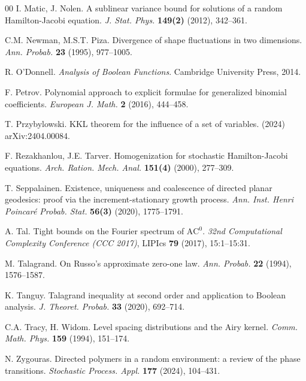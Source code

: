 \documentclass[reqno]{amsart}
\begin{document}
\begin{thebibliography}{00}
 I. Matic, J. Nolen. A sublinear variance bound 
for solutions of a random Hamilton-Jacobi equation. {\em J. Stat. Phys.}
{\bf 149(2)} (2012), 342--361.

 C.M. Newman, M.S.T. Piza. Divergence of shape 
fluctuations in two dimensions. {\em Ann. Probab.} {\bf 23} (1995), 
977--1005.

 R. O'Donnell. {\em Analysis of Boolean Functions}. 
Cambridge University Press, 2014.

 F. Petrov. Polynomial approach to explicit formulae 
for generalized binomial coefficients. {\em European J. Math.} {\bf 2} 
(2016), 444--458.

 T. Przybylowski. KKL theorem for the influence 
of a set of variables. (2024) arXiv:2404.00084.

 F. Rezakhanlou, J.E. Tarver. 
Homogenization for stochastic Hamilton-Jacobi equations. 
{\em Arch. Ration. Mech. Anal.} {\bf 151(4)} (2000), 277--309.

 T. Seppalainen. Existence, uniqueness and 
coalescence of directed planar geodesics: proof via the 
increment-stationary growth process. {\em Ann. Inst. Henri Poincar\'e 
Probab. Stat.} {\bf 56(3)} (2020), 1775--1791.

 A. Tal. Tight bounds on the Fourier spectrum of 
$\mathrm{AC}^0$. {\em 32nd Computational Complexity Conference (CCC 
2017)}, LIPIcs {\bf 79} (2017), 15:1--15:31.

 M. Talagrand. On Russo's approximate zero-one 
law. {\em Ann. Probab.} {\bf 22} (1994), 1576--1587.

 K. Tanguy. Talagrand inequality at second order and 
application to Boolean analysis. {\em J. Theoret. Probab.} {\bf 33} 
(2020), 692--714.

 C.A. Tracy, H. Widom. Level spacing 
distributions and the Airy kernel. {\em Comm. Math. Phys.} {\bf 159} 
(1994), 151--174.

 N. Zygouras. Directed polymers in a random 
environment: a review of the phase transitions. {\em Stochastic Process. 
Appl.} {\bf 177} (2024), 104--431.

\end{thebibliography}
\end{document}
